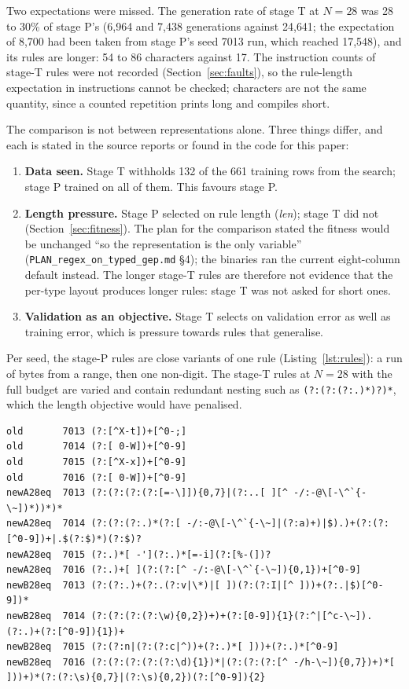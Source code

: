 \documentclass[sigconf,nonacm]{acmart}
\newcommand{\rx}{\lstinline[style=mono]}
\newcommand{\src}[1]{{\small\nolinkurl{#1}}}
\begin{document}
Two expectations were missed. The generation rate of stage T at $N=28$ was 28 to
30\% of stage P's (6{,}964 and 7{,}438 generations against 24{,}641; the
expectation of 8{,}700 had been taken from stage P's seed 7013 run, which reached
17{,}548), and its rules are longer: 54 to 86 characters against 17. The
instruction counts of stage-T rules were not recorded (Section~\ref{sec:faults}),
so the rule-length expectation in instructions cannot be checked; characters are
not the same quantity, since a counted repetition prints long and compiles short.

The comparison is not between representations alone. Three things differ, and
each is stated in the source reports or found in the code for this paper:

\begin{enumerate}
\item \textbf{Data seen.} Stage T withholds 132 of the 661 training rows from the
search; stage P trained on all of them. This favours stage P.
\item \textbf{Length pressure.} Stage P selected on rule length (\textit{len});
stage T did not (Section~\ref{sec:fitness}). The plan for the comparison stated
the fitness would be unchanged ``so the representation is the only variable''
(\src{PLAN_regex_on_typed_gep.md} \S4); the binaries ran the current
eight-column default instead. The longer stage-T rules are therefore not evidence
that the per-type layout produces longer rules: stage T was not asked for short
ones.
\item \textbf{Validation as an objective.} Stage T selects on validation error as
well as training error, which is pressure towards rules that generalise.
\end{enumerate}

Per seed, the stage-P rules are close variants of one rule
(Listing~\ref{lst:rules}): a run of bytes from a range, then one non-digit. The
stage-T rules at $N=28$ with the full budget are varied and contain redundant
nesting such as \rx!(?:(?:(?:.)*)?)*!, which the length objective would have
penalised.

\begin{lstlisting}[style=rules, float=t, caption={Winners per seed, stage P and
stage T with the full 180 s (from \texttt{logs/REGEX\_TYPED\_AB/\{old,newA28eq,newB28eq\}\_s*.log}).},
label=lst:rules]
old       7013 (?:[^X-t])+[^0-;]
old       7014 (?:[ 0-W])+[^0-9]
old       7015 (?:[^X-x])+[^0-9]
old       7016 (?:[ 0-W])+[^0-9]
newA28eq  7013 (?:(?:(?:(?:[=-\]]){0,7}|(?:..[ ][^ -/:-@\[-\^`{-\~])*))*)*
newA28eq  7014 (?:(?:(?:.)*(?:[ -/:-@\[-\^`{-\~]|(?:a)+)|$).)+(?:(?:[^0-9])+|.$(?:$)*)(?:$)?
newA28eq  7015 (?:.)*[ -'](?:.)*[=-i](?:[%-(])?
newA28eq  7016 (?:.)+[ ](?:(?:[^ -/:-@\[-\^`{-\~]){0,1})+[^0-9]
newB28eq  7013 (?:(?:.)+(?:.(?:v|\*)|[ ])(?:(?:I|[^ ]))+(?:.|$)[^0-9])*
newB28eq  7014 (?:(?:(?:(?:\w){0,2})+)+(?:[0-9]){1}(?:^|[^c-\~]).(?:.)+(?:[^0-9]){1})+
newB28eq  7015 (?:(?:n|(?:(?:c|^))+(?:.)*[ ]))+(?:.)*[^0-9]
newB28eq  7016 (?:(?:(?:(?:(?:\d){1})*|(?:(?:(?:[^ -/h-\~]){0,7})+)*[ ]))+)*(?:(?:\s){0,7}|(?:\s){0,2})(?:[^0-9]){2}
\end{lstlisting}
\end{document}
